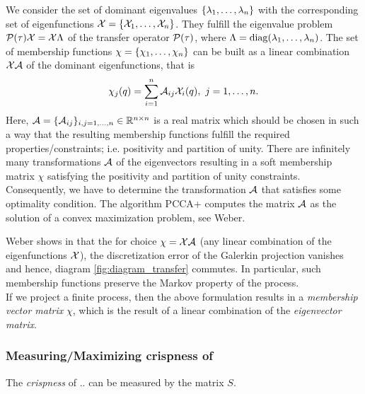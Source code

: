 
We consider the set of dominant eigenvalues $\{\lambda_1,\dots,\lambda_n\}$ with the corresponding set of eigenfunctions $\mathcal{X} = \{\mathcal{X}_1,\dots,\mathcal{X}_n\}$.
They fulfill the eigenvalue problem $\mathcal{P}(\tau) \mathcal{X} = \mathcal{X} \Lambda$ of the transfer operator $\mathcal{P}(\tau)$, where $\Lambda = \mathrm{diag}(\lambda_1,\dots,\lambda_n)$.
The set of membership functions $\chi= \{\chi_1,\dots,\chi_n \}$ can be built as a linear combination $\mathcal{X} \mathcal{A}$ of the dominant eigenfunctions, that is
\begin{equation}
\chi_j(q) = \sum_{i=1}^n \mathcal{A}_{ij} \mathcal{X}_i(q), \ j=1,\dots,n.
\end{equation}
Here,  $\mathcal{A} = \{\mathcal{A}_{ij}\}_{i,j=1,\dots,n} \in \mathbb{R}^{n\times n}$ is a real matrix which should be chosen in such a way that the resulting membership functions fulfill the required properties/constraints; i.e. positivity and partition of unity.
There are infinitely many transformations $\mathcal{A}$ of the eigenvectors resulting in a soft membership matrix
$\chi$ satisfying the positivity and partition of unity constraints.
Consequently, we have to determine the transformation  $\mathcal{A}$ that satisfies some optimality condition.
The algorithm PCCA+ computes the matrix $\mathcal{A}$ as the solution of a convex maximization problem, see Weber\cite{weber2006meshless}. 

Weber shows in \cite{weber2011subspace} that the for choice $\chi = \mathcal{X} \mathcal{A}$ (any linear combination of the eigenfunctions $\mathcal{X}$), the discretization error of the Galerkin projection vanishes and hence, diagram \ref{fig:diagram_transfer} commutes. In particular, such membership functions preserve the Markov property of the process.
\\

If we project a finite process, then the above formulation results in a \textit{membership vector matrix} $\chi$, which is the result of a linear combination of the \textit{eigenvector matrix}.

\subsubsection*{Measuring/Maximizing crispness of }
The \textit{crispness} of .. can be measured by the matrix $S$.

